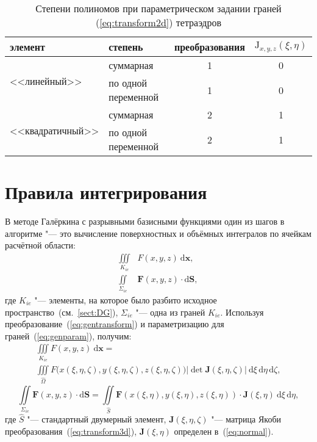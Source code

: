 \begin{table}[h]
	\centering
	\caption{Степени полиномов при параметрическом задании граней (\ref{eq:transform2d}) тетраэдров}
	\label{tab:paramorder:tetra}
	\smallskip
	\begin{tabular}{l l c c}
		\toprule
		элемент                           & степень             & преобразования & \(\mathrm J_{x,y,z}(\xi, \eta)\) \\
		\midrule
		\multirow{2}{*}{<<линейный>>}     & суммарная           & 1              & 0 \\
		                                  & по одной переменной & 1              & 0 \\
		\midrule
		\multirow{2}{*}{<<квадратичный>>} & суммарная           & 2              & 1 \\
		                                  & по одной переменной & 2              & 1 \\
		\bottomrule
	\end{tabular}
\end{table}



\section{Правила интегрирования}\label{sect:cubatures}

В методе Галёркина с разрывными базисными функциями один из шагов в алгоритме "--- это вычисление поверхностных и объёмных интегралов по ячейкам расчётной области:
\[
\begin{aligned}
\iiint\limits_{K_{ie}}&F(x, y, z)\: \mathrm d\mathbf x,\\
\iint\limits_{\Sigma_{ie}}&\mathbf F(x, y, z)\cdot \mathrm d\mathbf S,
\end{aligned}
\]
где \( K_{ie}\) "--- элементы, на которое было разбито исходное пространство~(см.~\ref{sect:DG}), \(\Sigma_{ie}\) "--- одна из граней \( K_{ie}\). Используя преобразование~(\ref{eq:gentransform}) и параметризацию для граней~(\ref{eq:genparam}), получим:
{
	\newcommand*{\vecxi}{\xi, \eta, \zeta}
	\begin{multline} \label{eq:volumeintegral}
	\iiint\limits_{K_{ie}}F(x, y, z)\: \mathrm d\mathbf x =\\
	\iiint\limits_{\hat\Omega}F\big(x(\vecxi), y(\vecxi), z(\vecxi)\big) \left|\det\mathbf J(\vecxi)\right|\:\mathrm d\xi\,\mathrm d\eta\, \mathrm d\zeta,
	\end{multline}
}
\begin{equation} \label{eq:surfaceintegral}
\iint\limits_{\Sigma_{ie}}\mathbf F(x, y, z)\cdot \mathrm d\mathbf{S} =
\iint\limits_{\hat{S}}\mathbf F(x(\xi, \eta), y(\xi, \eta), z(\xi, \eta))\cdot \mathbf J(\xi, \eta)\: \mathrm d\xi\, \mathrm d\eta,
\end{equation}
где \(\hat S\) "--- стандартный двумерный элемент, \(\mathbf J(\xi, \eta, \zeta)\) "--- матрица Якоби преобразования~(\ref{eq:transform3d}), \(\mathbf J(\xi, \eta)\) определен в~(\ref{eq:normal}).

